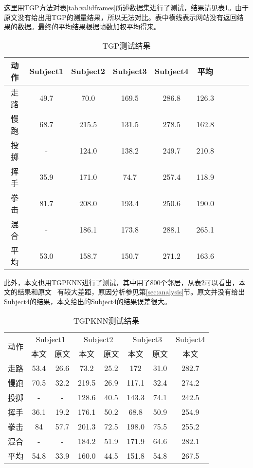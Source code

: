 这里用TGP方法对表\ref{tab:validframes}所述数据集进行了测试，结果请见表\ref{tab:TGPresult}。由于原文没有给出用TGP的测量结果，所以无法对比。表中横线表示网站没有返回结果的数据。最终的平均结果根据帧数加权平均得来。
\begin{table}[H]
  \centering
  \caption{TGP测试结果}
  \label{tab:TGPresult}
    \begin{tabular}{cccccccccc}
      \toprule[1.5pt]
      动作 & Subject1 & Subject2 & Subject3 & Subject4 & 平均 \\\midrule[1pt]
      走路 & 49.7& 70.0& 169.5& 286.8& 126.3\\
      慢跑 & 68.7& 215.5& 131.5& 278.5 & 162.8\\
      投掷 & - & 124.0& 138.2& 249.7 & 210.8\\
      挥手 & 35.9& 171.0& 74.7& 257.4 & 118.9\\
      拳击 & 81.7& 208.0& 193.4& 250.6 & 190.0\\
      混合 & - & 186.1 & 173.8& 288.1 & 265.1\\
      平均 & 53.0& 158.7& 150.7& 271.2& 163.6\\
      \bottomrule[1.5pt]
    \end{tabular}
\end{table}
此外，本文也用TGPKNN进行了测试，其中用了800个邻居，从表\ref{tab:TGPKNNresult}可以看出，本文的结果和原文~\cite{bo2010twin} 有较大差距，原因分析参见第\ref{sec:analysis}节。原文并没有给出Subject4的结果，本文给出的Subject4的结果误差很大。

\begin{table}[H]
  \centering
  \caption{TGPKNN测试结果}
  \label{tab:TGPKNNresult}
    \begin{tabular}{cccccccc}
      \toprule[1.5pt]
      \multirow{2}{2em}{动作} & \multicolumn{2}{c}{Subject1} & \multicolumn{2}{c}{Subject2} & \multicolumn{2}{c}{Subject3} & Subject4\\
      & 本文 & 原文 & 本文 & 原文 & 本文 & 原文 & 本文 \\\midrule[1pt]
      走路 & 53.4& 26.6& 73.2& 25.2& 172& 31.0& 282.7\\
      慢跑 & 70.5& 32.2& 219.5& 26.9& 117.1& 32.4& 274.2\\
      投掷 & -& -& 128.6& 40.5& 143.3& 74.1& 242.5\\
      挥手 & 36.1& 19.2& 176.1& 50.2& 68.8& 50.9& 254.9\\
      拳击 & 84& 57.7& 201.3& 72.5& 198.0& 75.5& 255.2\\
      混合 & -& -& 184.2& 51.9& 171.9& 64.6& 282.1\\
      平均 & 54.8& 33.9& 160.0& 44.5& 151.8& 54.8& 267.5\\
      \bottomrule[1.5pt]
    \end{tabular}
\end{table}


